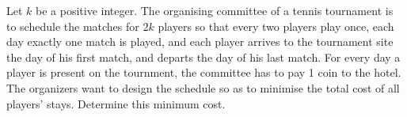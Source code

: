 Let $k$ be a positive integer.
The organising committee of a tennis tournament is to schedule the matches for $2k$ players so that every two players play once, each day exactly one match is played, and each player arrives to the tournament site the day of his first match, and departs the day of his last match.
For every day a player is present on the tournment, the committee has to pay 1 coin to the hotel.
The organizers want to design the schedule so as to minimise the total cost of all players' stays.
Determine this minimum cost.
